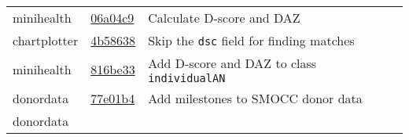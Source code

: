 \documentclass[]{book}
\begin{document}
\begin{longtable}[]{@{}lll@{}}
\begin{minipage}[t]{0.26\columnwidth}
minihealth\strut
\end{minipage} & \begin{minipage}[t]{0.29\columnwidth}\raggedright
\href{https://github.com/stefvanbuuren/minihealth/commit/06a04c9ce70546db7998de5147a15897af0c7ddb}{06a04c9}\strut
\end{minipage} & \begin{minipage}[t]{0.36\columnwidth}\raggedright
Calculate D-score and DAZ\strut
\end{minipage}\tabularnewline
\begin{minipage}[t]{0.26\columnwidth}\raggedright
chartplotter\strut
\end{minipage} & \begin{minipage}[t]{0.29\columnwidth}\raggedright
\href{https://github.com/stefvanbuuren/chartplotter/commit/4b5863813da5304ab5117feba216b7a0822fcd16}{4b58638}\strut
\end{minipage} & \begin{minipage}[t]{0.36\columnwidth}\raggedright
Skip the \texttt{dsc} field for finding matches\strut
\end{minipage}\tabularnewline
\begin{minipage}[t]{0.26\columnwidth}\raggedright
minihealth\strut
\end{minipage} & \begin{minipage}[t]{0.29\columnwidth}\raggedright
\href{https://github.com/stefvanbuuren/minihealth/commit/816be33b8921ab8d80d8a750d5c4e11966a58c18}{816be33}\strut
\end{minipage} & \begin{minipage}[t]{0.36\columnwidth}\raggedright
Add D-score and DAZ to class \texttt{individualAN}\strut
\end{minipage}\tabularnewline
\begin{minipage}[t]{0.26\columnwidth}\raggedright
donordata\strut
\end{minipage} & \begin{minipage}[t]{0.29\columnwidth}\raggedright
\href{https://github.com/stefvanbuuren/donordata/commit/77e01b40e2be75c19f27423092aa5626b0d5d3c3}{77e01b4}\strut
\end{minipage} & \begin{minipage}[t]{0.36\columnwidth}\raggedright
Add milestones to SMOCC donor data\strut
\end{minipage}\tabularnewline
\begin{minipage}[t]{0.26\columnwidth}\raggedright
donordata\strut
\end{minipage} & \begin{minipage}[t]{0.29\columnwidth}\raggedright

\end{minipage}
\end{longtable}
\end{document}
